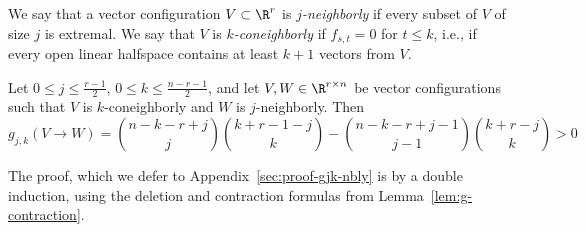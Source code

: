 %
We say that a vector configuration $V\subset \R^r$ is \emph{$j$-neighborly} if every subset of $V$ of size $j$ is extremal. We say that $V$ is \emph{$k$-coneighborly} if $f_{s,t}=0$ for $t\leq k$, i.e., if every open linear halfspace contains at least $k+1$ vectors from $V$.
\begin{lemma}\label{gjk-nbly} Let $0\leq j\leq \frac{r-1}{2}$, $0\leq k\leq \frac{n-r-1}{2}$, and let $V,W \in \R^{r\times n}$ be vector configurations such that $V$ is $k$-coneighborly and $W$ is $j$-neighborly. Then 
\begin{equation}
\label{eq:gjk-nbly}
\textstyle g_{j,k}(V\to W)=\binom{n-k-r+j}{j}\binom{k+r-1-j}{k} - \binom{n-k-r+j-1}{j-1} \binom{k+r-j}{k} > 0
\end{equation}
\end{lemma}
The proof, which we defer to Appendix~\ref{sec:proof-gjk-nbly} is by a double induction, using the deletion and contraction formulas from Lemma~\ref{lem:g-contraction}. 
%
%
